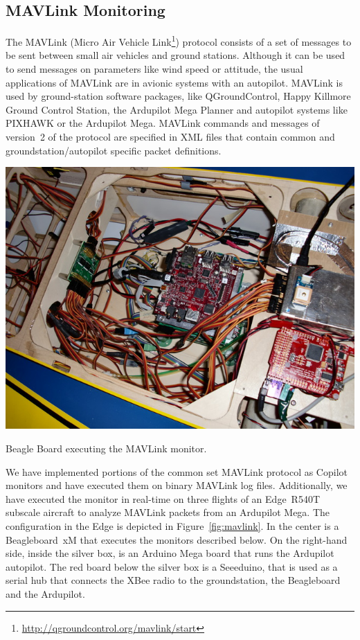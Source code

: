 \subsection{MAVLink Monitoring}

The MAVLink (Micro Air Vehicle
Link\footnote{\url{http://qgroundcontrol.org/mavlink/start}}) protocol consists
of a set of messages to be sent between small air vehicles and ground
stations. Although it can be used to send messages on parameters like wind
speed or attitude, the usual applications of MAVLink are in avionic systems with
an autopilot. MAVLink is used by ground-station software packages, like
QGroundControl, Happy Killmore Ground Control Station, the Ardupilot Mega
Planner and autopilot systems like PIXHAWK or the Ardupilot Mega. MAVLink
commands and messages of version~2 of the protocol are specified in XML files
that contain common and groundstation/autopilot specific packet definitions.

\begin{myfig}[ht!]
\includegraphics[scale=0.5]{Figs/inside_R3}
\caption{Beagle Board executing the MAVLink monitor.} \label{fig:mavlink}
\end{myfig}

We have implemented portions of the common set MAVLink protocol as Copilot
monitors and have executed them on binary MAVLink log files.  Additionally, we
have executed the monitor in real-time on three flights of an Edge~R540T
subscale aircraft to analyze MAVLink packets from an Ardupilot Mega.  The
configuration in the Edge is depicted in Figure~\ref{fig:mavlink}.  In the
center is a Beagleboard~xM that executes the monitors described below.  On the
right-hand side, inside the silver box, is an Arduino Mega board that runs the
Ardupilot autopilot.  The red board below the silver box is a Seeeduino, that is
used as a serial hub that connects the XBee radio to the groundstation, the
Beagleboard and the Ardupilot.

